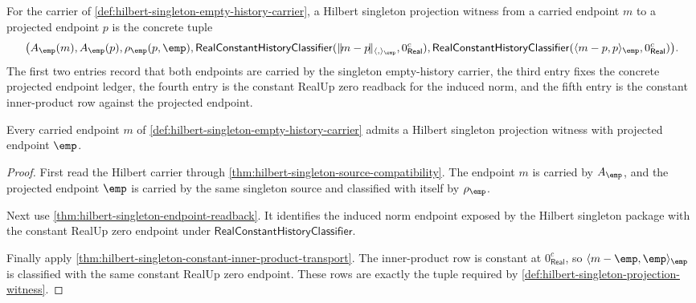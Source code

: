 \begin{definition}
\label{def:hilbert-singleton-projection-witness}
For the carrier of
\autoref{def:hilbert-singleton-empty-history-carrier}, a Hilbert singleton
projection witness from a carried endpoint $m$ to a projected endpoint $p$ is
the concrete tuple
$$
\bigl(A_{\emp}(m),A_{\emp}(p),\rho_{\emp}(p,\emp),
  \mathsf{RealConstantHistoryClassifier}
    (\|\!m-p\!\|_{\langle,\rangle_{\emp}},0_{\mathsf{Real}}^{c}),
  \mathsf{RealConstantHistoryClassifier}
    (\langle m-p,p\rangle_{\emp},0_{\mathsf{Real}}^{c})\bigr).
$$
The first two entries record that both endpoints are carried by the
singleton empty-history carrier, the third entry fixes the concrete projected
endpoint ledger, the fourth entry is the constant RealUp zero readback for
the induced norm, and the fifth entry is the constant inner-product row
against the projected endpoint.
\end{definition}

\begin{theorem}
\label{thm:hilbert-singleton-projection-existence}
Every carried endpoint $m$ of
\autoref{def:hilbert-singleton-empty-history-carrier} admits a Hilbert
singleton projection witness with projected endpoint $\emp$.
\end{theorem}
\begin{proof}
First read the Hilbert carrier through
\autoref{thm:hilbert-singleton-source-compatibility}. The endpoint $m$ is
carried by $A_{\emp}$, and the projected endpoint $\emp$ is carried by the
same singleton source and classified with itself by $\rho_{\emp}$.

Next use \autoref{thm:hilbert-singleton-endpoint-readback}. It identifies
the induced norm endpoint exposed by the Hilbert singleton package with the
constant RealUp zero endpoint under
$\mathsf{RealConstantHistoryClassifier}$.

Finally apply
\autoref{thm:hilbert-singleton-constant-inner-product-transport}. The
inner-product row is constant at $0_{\mathsf{Real}}^{c}$, so
$\langle m-\emp,\emp\rangle_{\emp}$ is classified with the same constant
RealUp zero endpoint. These rows are exactly the tuple required by
\autoref{def:hilbert-singleton-projection-witness}.
\end{proof}

